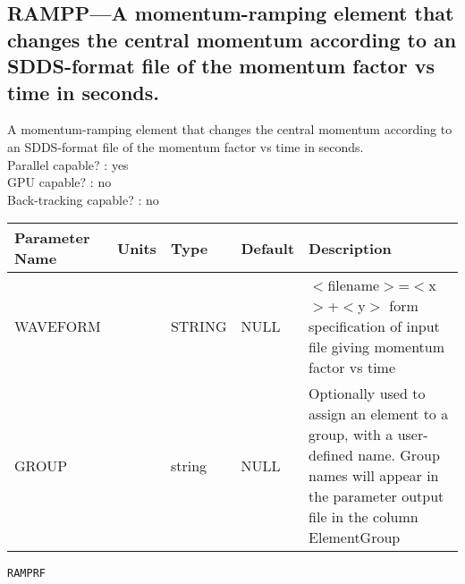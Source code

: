 \subsection{RAMPP---A momentum-ramping element that changes the central momentum according to an SDDS-format file of the momentum factor vs time in seconds.}
A momentum-ramping element that changes the central momentum according to an SDDS-format file of the momentum factor vs time in seconds.
\\
Parallel capable? : yes\\
GPU capable? : no\\
Back-tracking capable? : no\\
\begin{tabular}{|l|l|l|l|p{\descwidth}|} \hline
Parameter Name & Units & Type & Default & Description \\ \hline 
WAVEFORM &  & STRING &   NULL            & $<$filename$>$=$<$x$>$+$<$y$>$ form specification of input file giving momentum factor vs time  \\ \hline 
GROUP &  & string & NULL & Optionally used to assign an element to a group, with a user-defined name.  Group names will appear in the parameter output file in the column ElementGroup  \\ \hline 
\end{tabular}

\vspace*{0.5in}

\newpage
\begin{center}{\Large\verb|RAMPRF|}\end{center}
